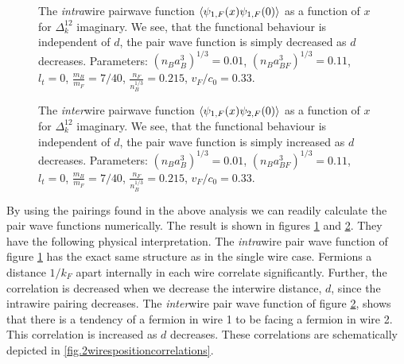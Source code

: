 \begin{figure} 
\begin{center}  
  
\caption{The \textit{intra}wire pairwave function $\braket{\psi_{1,F}(x)\psi_{1,F}(0)}$ as a function of $x$ for $\Delta^{12}_k$ imaginary. We see, that the functional behaviour is independent of $d$, the pair wave function is simply decreased as $d$ decreases. Parameters: $(n_Ba_B^3)^{1/3} = 0.01$, $(n_Ba_{BF}^3)^{1/3} = 0.11$, $l_t = 0$, $\frac{m_B}{m_F} = 7/40$, $\frac{n_F}{n_B^{1/3}} = 0.215$, $v_F/c_0 = 0.33$. }  
\label{fig.2wirespairwavefunction11}  
\end{center}    
\end{figure}

\begin{figure} 
\begin{center}  
  
\caption{The \textit{inter}wire pairwave function $\braket{\psi_{1,F}(x)\psi_{2,F}(0)}$ as a function of $x$ for $\Delta^{12}_k$ imaginary. We see, that the functional behaviour is independent of $d$, the pair wave function is simply increased as $d$ decreases. Parameters: $(n_Ba_B^3)^{1/3} = 0.01$, $(n_Ba_{BF}^3)^{1/3} = 0.11$, $l_t = 0$, $\frac{m_B}{m_F} = 7/40$, $\frac{n_F}{n_B^{1/3}} = 0.215$, $v_F/c_0 = 0.33$. }  
\label{fig.2wirespairwavefunction12}  
\end{center}    
\end{figure}

By using the pairings found in the above analysis we can readily calculate the pair wave functions numerically. The result is shown in figures \ref{fig.2wirespairwavefunction11} and \ref{fig.2wirespairwavefunction12}. They have the following physical interpretation. The \textit{intra}wire pair wave function of figure \ref{fig.2wirespairwavefunction11} has the exact same structure as in the single wire case. Fermions a distance $1/k_F$ apart internally in each wire correlate significantly. Further, the correlation is decreased when we decrease the interwire distance, $d$, since the intrawire pairing decreases. The \textit{inter}wire pair wave function of figure \ref{fig.2wirespairwavefunction12}, shows that there is a tendency of a fermion in wire 1 to be facing a fermion in wire 2. This correlation is increased as $d$ decreases. These correlations are schematically depicted in \ref{fig.2wirespositioncorrelations}. 

